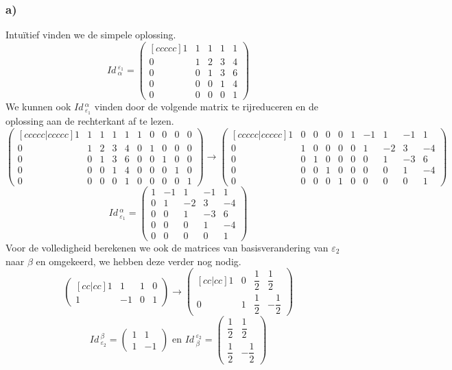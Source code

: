 \documentclass[lineaire_algebra_oplossingen.tex]{subfiles}
\begin{document}
\subsubsection*{a)}
Intu\"itief vinden we de simpele oplossing.
\[
\textit{Id}\,_\alpha^{\varepsilon_1} =
\begin{pmatrix}[ccccc]
1 & 1 & 1 & 1 & 1 \\ 
0 & 1 & 2 & 3 & 4 \\ 
0 & 0 & 1 & 3 & 6 \\ 
0 & 0 & 0 & 1 & 4 \\ 
0 & 0 & 0 & 0 & 1
\end{pmatrix}
\]
We kunnen ook $\textit{Id}\,_{\varepsilon_1}^\alpha$ vinden door de volgende matrix te rijreduceren en de oplossing aan de rechterkant af te lezen.
\[
\begin{pmatrix}[ccccc|ccccc]
1 & 1 & 1 & 1 & 1 & 1 & 0 & 0 & 0 & 0\\ 
0 & 1 & 2 & 3 & 4 & 0 & 1 & 0 & 0 & 0\\ 
0 & 0 & 1 & 3 & 6 & 0 & 0 & 1 & 0 & 0\\ 
0 & 0 & 0 & 1 & 4 & 0 & 0 & 0 & 1 & 0\\ 
0 & 0 & 0 & 0 & 1 & 0 & 0 & 0 & 0 & 1
\end{pmatrix}
\longrightarrow
\begin{pmatrix}[ccccc|ccccc]
1 & 0 & 0 & 0 & 0 & 1 & -1 & 1 & -1 & 1 \\
0 & 1 & 0 & 0 & 0 & 0 & 1 & -2 & 3 & -4\\
0 & 0 & 1 & 0 & 0 & 0 & 0 & 1 & -3 & 6\\
0 & 0 & 0 & 1 & 0 & 0 & 0 & 0 & 1 & -4\\
0 & 0 & 0 & 0 & 1 & 0 & 0 & 0 & 0 & 1
\end{pmatrix}
\]
\[
\textit{Id}\,_{\varepsilon_1}^\alpha
=
\begin{pmatrix}
1 & -1 &  1 & -1 &  1 \\
0 &  1 & -2 &  3 & -4 \\
0 &  0 &  1 & -3 &  6 \\
0 &  0 &  0 &  1 & -4 \\
0 &  0 &  0 &  0 &  1
\end{pmatrix}
\]
Voor de volledigheid berekenen we ook de matrices van basisverandering van $\varepsilon_2$ naar $\beta$ en omgekeerd, we hebben deze verder nog nodig.
\[
\begin{pmatrix}[cc|cc]
1 & 1 & 1 & 0\\ 
1 & -1 & 0 & 1
\end{pmatrix}
\longrightarrow
\begin{pmatrix}[cc|cc]
1 & 0 & \dfrac{1}{2} & \dfrac{1}{2}\\[8pt]
0 & 1 & \dfrac{1}{2} & -\dfrac{1}{2}
\end{pmatrix}
\]
\[
\textit{Id}\,_{\varepsilon_2}^\beta =
\begin{pmatrix}
1 & 1\\ 
1 & -1
\end{pmatrix}
\text{ en }
\textit{Id}\,_\beta^{\varepsilon_2} =
\begin{pmatrix}
\dfrac{1}{2} & \dfrac{1}{2}\\[8pt]
\dfrac{1}{2} & -\dfrac{1}{2}
\end{pmatrix}
\]
\end{document}
